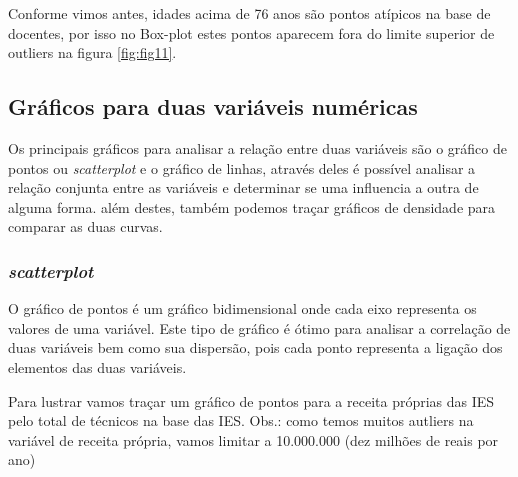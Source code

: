 \documentclass[12pt,]{style/krantz}
\makeatletter
\newenvironment{Shaded}{\begin{snugshade}}{\end{snugshade}}
\newcommand{\KeywordTok}[1]{\textcolor[rgb]{0.13,0.29,0.53}{\textbf{#1}}}
\newcommand{\DataTypeTok}[1]{\textcolor[rgb]{0.13,0.29,0.53}{#1}}
\newcommand{\DecValTok}[1]{\textcolor[rgb]{0.00,0.00,0.81}{#1}}
\newcommand{\StringTok}[1]{\textcolor[rgb]{0.31,0.60,0.02}{#1}}
\newcommand{\OperatorTok}[1]{\textcolor[rgb]{0.81,0.36,0.00}{\textbf{#1}}}
\newcommand{\NormalTok}[1]{#1}
\newenvironment{kframe}{%
\medskip{}
\setlength{\fboxsep}{.8em}
 \def\at@end@of@kframe{}%
 \ifinner\ifhmode%
  \def\at@end@of@kframe{\end{minipage}}%
  \begin{minipage}{\columnwidth}%
 \fi\fi%
 \def\FrameCommand##1{\hskip\@totalleftmargin \hskip-\fboxsep
 \colorbox{shadecolor}{##1}\hskip-\fboxsep
     \hskip-\linewidth \hskip-\@totalleftmargin \hskip\columnwidth}%
 \MakeFramed {\advance\hsize-\width
   \@totalleftmargin\z@ \linewidth\hsize
   \@setminipage}}%
 {\par\unskip\endMakeFramed%
 \at@end@of@kframe}
\renewenvironment{Shaded}{\begin{kframe}}{\end{kframe}}
\theoremstyle{definition}
\theoremstyle{definition}
\theoremstyle{definition}
\theoremstyle{remark}
\let\BeginKnitrBlock\begin \let\EndKnitrBlock\end
\makeatother
\begin{document}
Conforme vimos antes, idades acima de 76 anos são pontos atípicos na
base de docentes, por isso no Box-plot estes pontos aparecem fora do
limite superior de outliers na figura \ref{fig:fig11}.

\subsection{Gráficos para duas variáveis
numéricas}\label{graficos-para-duas-variaveis-numericas}

Os principais gráficos para analisar a relação entre duas variáveis são
o gráfico de pontos ou \emph{scatterplot} e o gráfico de linhas, através
deles é possível analisar a relação conjunta entre as variáveis e
determinar se uma influencia a outra de alguma forma. além destes,
também podemos traçar gráficos de densidade para comparar as duas
curvas.

\subsubsection{\texorpdfstring{\emph{scatterplot}}{scatterplot}}\label{scatterplot}

O gráfico de pontos é um gráfico bidimensional onde cada eixo representa
os valores de uma variável. Este tipo de gráfico é ótimo para analisar a
correlação de duas variáveis bem como sua dispersão, pois cada ponto
representa a ligação dos elementos das duas variáveis.

\BeginKnitrBlock{example}
\protect\hypertarget{exm:unnamed-chunk-78}{}{\label{exm:unnamed-chunk-78}
}Para lustrar vamos traçar um gráfico de pontos para a receita próprias
das IES pelo total de técnicos na base das IES. Obs.: como temos muitos
autliers na variável de receita própria, vamos limitar a 10.000.000 (dez
milhões de reais por ano)
\EndKnitrBlock{example}

\begin{Shaded}
\end{Shaded}
\end{document}
